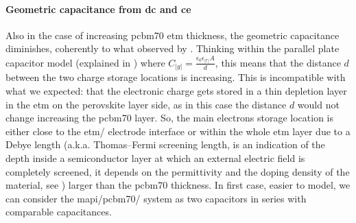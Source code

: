 \begin{figure}
\end{figure}

\paragraph{Geometric capacitance from \gls{dc} and \gls{ce}}
Also in the case of increasing \gls{pcbm70} \gls{etm} thickness, the geometric capacitance diminishes, coherently to what observed by .
Thinking within the parallel plate capacitor model (explained in ) where $C_|g| = \frac{\epsilon_0 \epsilon_|r| A}{d}$, this means that the distance $d$ between the two charge storage locations is increasing.
This is incompatible with what we expected: that the electronic charge gets stored in a thin depletion layer in the \gls{etm} on the perovskite layer side, as in this case the distance $d$ would not change increasing the \gls{pcbm70} layer.
So, the main electrons storage location is either close to the \gls{etm}\-/ electrode interface or within the whole \gls{etm} layer due to a Debye length (a.k.a. Thomas–Fermi screening length, is an indication of the depth inside a semiconductor layer at which an external electric field is completely screened, it depends on the permittivity and the doping density of the material, see ) larger than the \gls{pcbm70} thickness.
In first case, easier to model, we can consider the \gls{mapi}\-/\gls{pcbm70}\-/ system as two capacitors in series with comparable capacitances.

